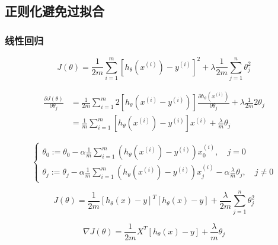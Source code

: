 \subsection{正则化避免过拟合}
\subsubsection{线性回归}

\begin{equation}
	J(\theta) = \frac{1}{2m}\sum_{i=1}^m [h_\theta(x^{(i)})-y^{(i)}]^2 + \lambda \frac{1}{2m} \sum_{j=1}^n\theta_j^2
\end{equation}

\begin{equation}\begin{aligned}
	\frac{\partial{J(\theta)}}{\partial{\theta_j}} &= \frac{1}{2m}\sum_{i=1}^m 2[h_\theta(x^{(i)}-y^{(i)})] \frac{\partial{h_\theta(x^{(i)})}}{\partial{\theta_j}} + \lambda \frac{1}{2m} 2  \theta_j \\
	    &= \frac{1}{m}\sum_{i=1}^m[h_\theta(x^{(i)})-y^{(i)}]x^{(i)} + \frac{\lambda}{m} \theta_j
\end{aligned}\end{equation}

\[\begin{cases}
	\theta_0 := \theta_0 - \alpha \frac{1}{m} \sum_{i=1}^m(h_\theta(x^{(i)}) - y^{(i)})x_0^{(i)}, \quad j=0 \\
	\theta_j := \theta_j - \alpha \frac{1}{m} \sum_{i=1}^m(h_\theta(x^{(i)}) - y^{(i)})x_j^{(i)} - \alpha\frac{\lambda}{m}\theta_j, \quad j \neq 0
\end{cases}\]



\begin{equation}
	J(\theta) = \frac{1}{2m} \left[h_\theta(x) - y\right]^T \left[ h_\theta(x) - y\right] + \frac{\lambda}{2m} \sum_{j=1}^n\theta_j^2
\end{equation}

\begin{equation}
	\nabla J(\theta) = \frac{1}{2m} X^T \left[h_\theta(x) - y\right] + \frac{\lambda}{m} \theta_j
\end{equation}


